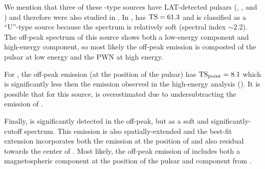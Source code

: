 We mention that three of these \PWNcClass-type sources have
\ac{LAT}-detected pulsars (, , and ) and
therefore were also studied in .  In ,
 has $\mathrm{TS}=61.3$ and is classified as a ``U''-type source
because the spectrum is relatively soft (spectral index $\sim2.2$).
The off-peak spectrum of this source shows both a low-energy component and
high-energy component, so most likely the off-peak emission is composted
of the pulsar at low energy and the \ac{PWN} at high energy.

For , the off-peak emission (at the position of the pulsar)
has $\mathrm{TS}_\mathrm{point}=8.1$ which is significantly less then the emission observed
in the high-energy analysis ().  It is possible that for this
source, \tstev is overestimated due to undersubtracting the emission
of .

Finally,  is significantly detected in the off-peak, but
as a soft and significantly-cutoff spectrum. This emission is also
spatially-extended and the best-fit extension incorporates both the
emission at the position of  and also residual towards the
center of . Most likely, the off-peak emission of 
includes both a magnetospheric component at the position of the pulsar
and  component from .
